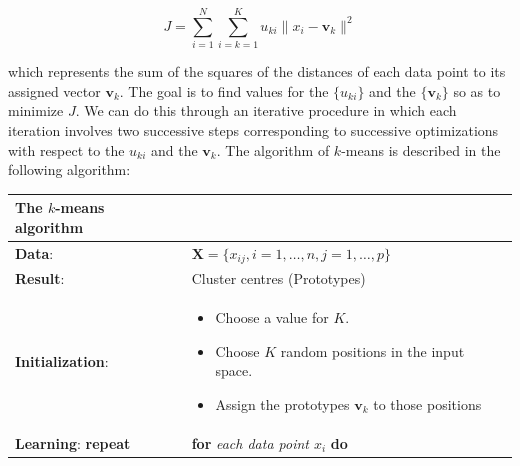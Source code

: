 \documentclass[]{book}
\providecommand{\tightlist}{%
  \setlength{\itemsep}{0pt}\setlength{\parskip}{0pt}}
\theoremstyle{definition}
\theoremstyle{definition}
\theoremstyle{definition}
\theoremstyle{remark}
\begin{document}
\[J= \sum_{i=1}^{N} \sum_{i=k=1}^{K} u_{ki} \| x_{i}- \mathbf{v}_{k} \|^2\]

which represents the sum of the squares of the distances of each data
point to its assigned vector \(\mathbf{v}_{k}\). The goal is to find
values for the \(\{u_{ki}\}\) and the \(\{\mathbf{v}_{k}\}\) so as to
minimize \(J\). We can do this through an iterative procedure in which
each iteration involves two successive steps corresponding to successive
optimizations with respect to the \(u_{ki}\) and the \(\mathbf{v}_{k}\).
The algorithm of \(k\)-means is described in the following algorithm:

\begin{longtable}[]{@{}ll@{}}
\toprule
\begin{minipage}[b]{0.36\columnwidth}\raggedright\strut
The \(k\)-means algorithm\strut
\end{minipage} & \begin{minipage}[b]{0.58\columnwidth}\raggedright\strut
\strut
\end{minipage}\tabularnewline
\midrule
\endhead
\begin{minipage}[t]{0.36\columnwidth}\raggedright\strut
\textbf{Data}:\strut
\end{minipage} & \begin{minipage}[t]{0.58\columnwidth}\raggedright\strut
\(\textbf{X}=\{x_{ij}, i=1,\ldots,n, j=1,\ldots,p\}\)\strut
\end{minipage}\tabularnewline
\begin{minipage}[t]{0.36\columnwidth}\raggedright\strut
\textbf{Result}:\strut
\end{minipage} & \begin{minipage}[t]{0.58\columnwidth}\raggedright\strut
Cluster centres (Prototypes)\strut
\end{minipage}\tabularnewline
\begin{minipage}[t]{0.48\columnwidth}\raggedright\strut
\textbf{Initialization}:\strut
\end{minipage} & \begin{minipage}[t]{0.48\columnwidth}\raggedright\strut
\begin{itemize}
\tightlist
\item
  Choose a value for \(K\).
\item
  Choose \(K\) random positions in the input space.
\item
  Assign the prototypes \(\mathbf{v}_{k}\) to those positions
\end{itemize}\strut
\end{minipage}\tabularnewline
\begin{minipage}[t]{0.48\columnwidth}\raggedright\strut
\textbf{Learning}: \textbf{repeat}\strut
\end{minipage} & \begin{minipage}[t]{0.48\columnwidth}\raggedright\strut
\textbf{for} \emph{each data point \(x_i\)} \textbf{do}


\end{minipage}
\end{longtable}
\end{document}
